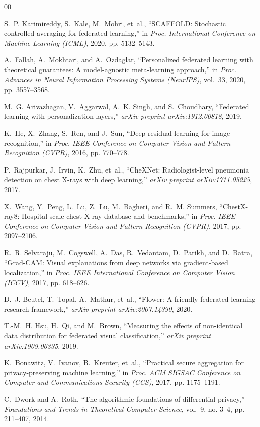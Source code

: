 \documentclass[conference]{IEEEtran}
\renewenvironment{thebibliography}[1]{
  \begin{oldthebibliography}{#1}
    \footnotesize
    \setlength{\itemsep}{0.4pt plus 0.2pt}
    \setlength{\parskip}{0pt}
}{
  \end{oldthebibliography}
}
\begin{document}
\begin{thebibliography}{00}
S.~P. Karimireddy, S.~Kale, M.~Mohri, et~al., ``SCAFFOLD: Stochastic controlled averaging for federated learning,'' in \emph{Proc. International Conference on Machine Learning (ICML)}, 2020, pp. 5132--5143.

A.~Fallah, A.~Mokhtari, and A.~Ozdaglar, ``Personalized federated learning with theoretical guarantees: A model-agnostic meta-learning approach,'' in \emph{Proc. Advances in Neural Information Processing Systems (NeurIPS)}, vol.~33, 2020, pp. 3557--3568.

M.~G. Arivazhagan, V.~Aggarwal, A.~K. Singh, and S.~Choudhary, ``Federated learning with personalization layers,'' \emph{arXiv preprint arXiv:1912.00818}, 2019.

K.~He, X.~Zhang, S.~Ren, and J.~Sun, ``Deep residual learning for image recognition,'' in \emph{Proc. IEEE Conference on Computer Vision and Pattern Recognition (CVPR)}, 2016, pp. 770--778.

P.~Rajpurkar, J.~Irvin, K.~Zhu, et~al., ``CheXNet: Radiologist-level pneumonia detection on chest X-rays with deep learning,'' \emph{arXiv preprint arXiv:1711.05225}, 2017.

X.~Wang, Y.~Peng, L.~Lu, Z.~Lu, M.~Bagheri, and R.~M. Summers, ``ChestX-ray8: Hospital-scale chest X-ray database and benchmarks,'' in \emph{Proc. IEEE Conference on Computer Vision and Pattern Recognition (CVPR)}, 2017, pp. 2097--2106.

R.~R. Selvaraju, M.~Cogswell, A.~Das, R.~Vedantam, D.~Parikh, and D.~Batra, ``Grad-CAM: Visual explanations from deep networks via gradient-based localization,'' in \emph{Proc. IEEE International Conference on Computer Vision (ICCV)}, 2017, pp. 618--626.

D.~J. Beutel, T.~Topal, A.~Mathur, et~al., ``Flower: A friendly federated learning research framework,'' \emph{arXiv preprint arXiv:2007.14390}, 2020.

T.-M.~H. Hsu, H.~Qi, and M.~Brown, ``Measuring the effects of non-identical data distribution for federated visual classification,'' \emph{arXiv preprint arXiv:1909.06335}, 2019.

K.~Bonawitz, V.~Ivanov, B.~Kreuter, et~al., ``Practical secure aggregation for privacy-preserving machine learning,'' in \emph{Proc. ACM SIGSAC Conference on Computer and Communications Security (CCS)}, 2017, pp. 1175--1191.

C.~Dwork and A.~Roth, ``The algorithmic foundations of differential privacy,'' \emph{Foundations and Trends in Theoretical Computer Science}, vol.~9, no. 3--4, pp. 211--407, 2014.

\end{thebibliography}
\end{document}
